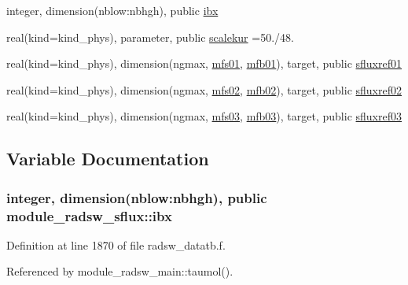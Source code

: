 \begin{DoxyCompactItemize}
\item 
integer, dimension(nblow\+:nbhgh), public \hyperlink{namespacemodule__radsw__sflux_acb1498ecf044449dbe6d7a5630fdc375}{ibx}
\item 
real(kind=kind\+\_\+phys), parameter, public \hyperlink{namespacemodule__radsw__sflux_a2f3280a36f27cea89fc66d71e799cf6d}{scalekur} =50./48.
\item 
real(kind=kind\+\_\+phys), dimension(ngmax, \hyperlink{namespacemodule__radsw__sflux_aba08e6f9d4dccd130e87300e6fd0ed58}{mfs01}, \hyperlink{namespacemodule__radsw__sflux_a08a0f1278962ac27634169ea7632bc70}{mfb01}), target, public \hyperlink{namespacemodule__radsw__sflux_a84205f359fb3e1a0e1d03e755c52dc78}{sfluxref01}
\item 
real(kind=kind\+\_\+phys), dimension(ngmax, \hyperlink{namespacemodule__radsw__sflux_acca3bbc0dd125a3e8c3734c58c48e79b}{mfs02}, \hyperlink{namespacemodule__radsw__sflux_afdf71cabed6ae0076d98ff0e563dbc61}{mfb02}), target, public \hyperlink{namespacemodule__radsw__sflux_aa57fca862289bd57327b9c3ef27e3e2f}{sfluxref02}
\item 
real(kind=kind\+\_\+phys), dimension(ngmax, \hyperlink{namespacemodule__radsw__sflux_a5bd55a5106ce82bd47250d38d9b8f22a}{mfs03}, \hyperlink{namespacemodule__radsw__sflux_a2e3b510d781c596fa0bb9b1359a988dd}{mfb03}), target, public \hyperlink{namespacemodule__radsw__sflux_a95d2640cf0e6cf0ba4a8ca1758806e48}{sfluxref03}
\end{DoxyCompactItemize}


\subsection{Variable Documentation}
\subsubsection[{\texorpdfstring{ibx}{ibx}}]{\setlength{\rightskip}{0pt plus 5cm}integer, dimension(nblow\+:nbhgh), public module\+\_\+radsw\+\_\+sflux\+::ibx}\hypertarget{namespacemodule__radsw__sflux_acb1498ecf044449dbe6d7a5630fdc375}{}\label{namespacemodule__radsw__sflux_acb1498ecf044449dbe6d7a5630fdc375}


Definition at line 1870 of file radsw\+\_\+datatb.\+f.



Referenced by module\+\_\+radsw\+\_\+main\+::taumol().

